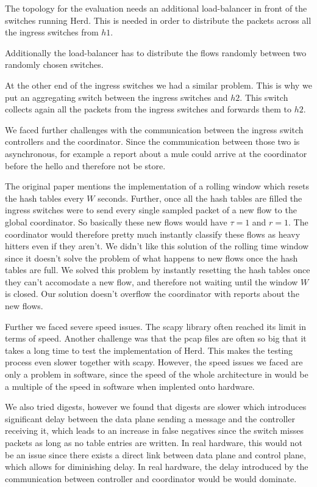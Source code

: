 \documentclass[11pt,oneside,a4paper]{article}
\begin{document}
The topology for the evaluation needs an additional load-balancer in front of the switches running Herd. This is needed in order to distribute the packets across all the ingress switches from $h1$. 

Additionally the load-balancer has to distribute the flows randomly between two randomly chosen switches. 

At the other end of the ingress switches we had a similar problem. This is why we put an aggregating switch between the ingress switches and $h2$. This switch collects again all the packets from the ingress switches and forwards them to $h2$. 

We faced further challenges with the communication between the ingress switch controllers and the coordinator. Since the communication between those two is asynchronous, for example a report about a mule could arrive at the coordinator before the hello and therefore not be store.%

The original paper mentions the implementation of a rolling window which resets the hash tables every $W$ seconds. Further, once all the hash tables are filled the ingress switches were to send every single sampled packet of a new flow to the global coordinator. So basically these new flows would have $\tau = 1$ and $r = 1$. The coordinator would therefore pretty much instantly classify these flows as heavy hitters even if they aren't. We didn't like this solution of the rolling time window since it doesn't solve the problem of what happens to new flows once the hash tables are full. We solved this problem by instantly resetting the hash tables once they can't accomodate a new flow, and therefore not waiting until the window $W$ is closed. Our solution doesn't overflow the coordinator with reports about the new flows.

Further we faced severe speed issues. The scapy library often reached its limit in terms of speed. Another challenge was that the pcap files are often so big that it takes a long time to test the implementation of Herd. This makes the testing process even slower together with scapy. 
However, the speed issues we faced are only a problem in software, since the speed of the whole architecture in would be a multiple of the speed in software when implented onto hardware.

We also tried digests, however we found that digests are slower which introduces significant delay between the data plane sending a message and the controller receiving it, which leads to an increase in false negatives since the switch misses packets as long as no table entries are written. In real hardware, this would not be an issue since there exists a direct link between data plane and control plane, which allows for diminishing delay. In real hardware, the delay introduced by the communication between controller and coordinator would be would dominate.
\end{document}
